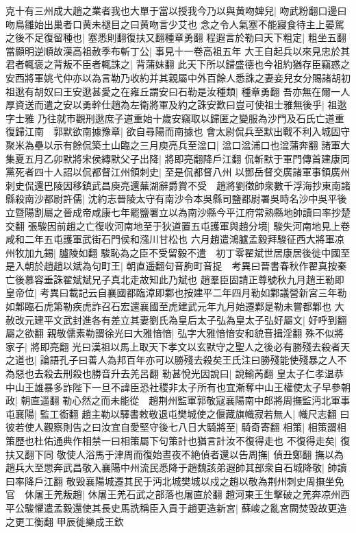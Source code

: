 克十有三州成大趙之業者我也大單于當以授我今乃以與黄吻婢兒|{
	吻武粉翻口邊曰吻鳥雛始出巢者口黄未褪目之曰黄吻言少艾也}
念之令人氣塞不能寢食待主上晏駕之後不足復留種也|{
	塞悉則翻復扶又翻種章勇翻}
程遐言於勒曰天下粗定|{
	粗坐五翻}
當顯明逆順故漢高祖赦季布斬丁公|{
	事見十一卷高祖五年}
大王自起兵以來見忠於其君者輒褒之背叛不臣者輒誅之|{
	背蒲妹翻}
此天下所以歸盛德也今祖約猶存臣竊惑之安西將軍姚弋仲亦以為言勒乃收約并其親屬中外百餘人悉誅之妻妾兒女分賜諸胡初祖逖有胡奴曰王安逖甚愛之在雍丘謂安曰石勒是汝種類|{
	種章勇翻}
吾亦無在爾一人厚資送而遣之安以勇幹仕趙為左衛將軍及約之誅安歎曰豈可使祖士雅無後乎|{
	祖逖字士雅}
乃往就市觀刑逖庶子道重始十歲安竊取以歸匿之變服為沙門及石氏亡道重復歸江南　郭默欲南據豫章|{
	欲自尋陽而南據也}
會太尉侃兵至默出戰不利入城固守聚米為壘以示有餘侃築土山臨之三月庾亮兵至湓口|{
	湓口湓浦口也湓蒲奔翻}
諸軍大集夏五月乙卯默將宋侯縳默父子出降|{
	將即亮翻降戶江翻}
侃斬默于軍門傳首建康同黨死者四十人詔以侃都督江州領刺史|{
	至是侃都督八州}
以鄧岳督交廣諸軍事領廣州刺史侃還巴陵因移鎮武昌庾亮還蕪湖辭爵賞不受　趙將劉徵帥衆數千浮海抄東南諸縣殺南沙都尉許儒|{
	沈約志晉陵太守有南沙令本吳縣司鹽都尉署吳時名沙中吳平後立暨陽割屬之晉成帝咸康七年罷鹽署立以為南沙縣今平江府常熟縣地帥讀曰率抄楚交翻}
張駿因前趙之亡復收河南地至于狄道置五屯護軍與趙分境|{
	駿失河南地見上卷咸和二年五屯護軍武街石門侯和漒川甘松也}
六月趙遣鴻臚孟毅拜駿征西大將軍凉州牧加九錫|{
	臚陵如翻}
駿恥為之臣不受留毅不遣　初丁零翟斌世居康居後徙中國至是入朝於趙趙以斌為句町王|{
	朝直遥翻句音胊町音捉　考異曰晉書春秋作翟真按秦亡後慕容垂誅翟斌斌兄子真北走故知此乃斌也}
趙羣臣固請正尊號秋九月趙王勒即皇帝位|{
	考異曰載記云自襄國都臨漳即鄴也按建平二年四月勒如鄴議營新宮三年勒如鄴臨石虎第勒疾虎詐召石宏還襄國至虎建武元年九月始遷鄴是勒未嘗都鄴也}
大赦改元建平文武封進各有差立其妻劉氏為皇后太子弘為皇太子弘好屬文|{
	好呼到翻屬之欲翻}
親敬儒素勒謂徐光曰大雅愔愔|{
	弘字大雅愔愔安和貌音揖淫翻}
殊不似將家子|{
	將即亮翻}
光曰漢祖以馬上取天下孝文以玄默守之聖人之後必有勝殘去殺者天之道也|{
	論語孔子曰善人為邦百年亦可以勝殘去殺矣王氏注曰勝殘能使殘暴之人不為惡也去殺去刑殺也勝音升去羌呂翻}
勒甚悅光因說曰|{
	說輸芮翻}
皇太子仁孝温恭中山王雄暴多詐陛下一旦不諱臣恐社稷非太子所有也宜漸奪中山王權使太子早參朝政|{
	朝直遥翻}
勒心然之而未能從　趙荆州監軍郭敬寇襄陽南中郎將周撫監沔北軍事屯襄陽|{
	監工銜翻}
趙主勒以驛書敕敬退屯樊城使之偃藏旗幟寂若無人|{
	幟尺志翻}
曰彼若使人觀察則告之曰汝宜自愛堅守後七八日大騎將至|{
	騎奇寄翻}
相策|{
	相策謂相策歷也杜佑通典作相禁一曰相策屬下句策計也猶言計汝不復得走也}
不復得走矣|{
	復扶又翻下同}
敬使人浴馬于津周而復始晝夜不絶偵者還以告周撫|{
	偵丑鄭翻}
撫以為趙兵大至愳奔武昌敬入襄陽中州流民悉降于趙魏該弟遐帥其部衆自石城降敬|{
	帥讀曰率降戶江翻}
敬毁襄陽城遷其民于沔北城樊城以戍之趙以敬為荆州刺史周撫坐免官　休屠王羌叛趙|{
	休屠王羌石武之部落也屠直於翻}
趙河東王生擊破之羌奔凉州西平公駿懼遣孟毅還使其長史馬詵稱臣入貢于趙更造新宮|{
	蘇峻之亂宮闕焚毁故更造之更工衡翻}
甲辰徙樂成王欽

